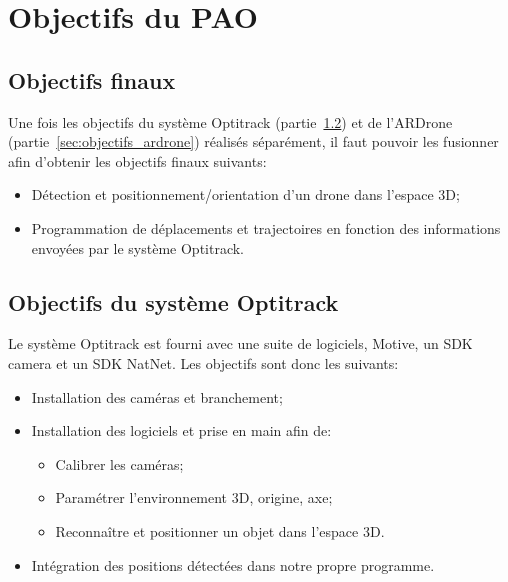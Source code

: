 \chapter{Objectifs du PAO}
\label{chap:objectifs_pao}

	\section{Objectifs finaux}
	\label{sec:objectifs_finaux}
		Une fois les objectifs du système Optitrack (partie~\ref{sec:objectifs_systeme_optitrack}) et de l'ARDrone (partie~\ref{sec:objectifs_ardrone}) réalisés séparément, il faut pouvoir les fusionner afin d'obtenir les objectifs finaux suivants: \\
		\begin{itemize}
			\item Détection et positionnement/orientation d'un drone dans l'espace 3D\@;
			\item Programmation de déplacements et trajectoires en fonction des informations envoyées par le système Optitrack.
		\end{itemize}


	\section{Objectifs du système Optitrack}
	\label{sec:objectifs_systeme_optitrack}
		Le système Optitrack est fourni avec une suite de logiciels, Motive, un SDK camera et un SDK NatNet. Les objectifs sont donc les suivants: \\
		\begin{itemize}
			\item Installation des caméras et branchement;
			\item Installation des logiciels et prise en main afin de:
			\begin{itemize}
				\item Calibrer les caméras;
				\item Paramétrer l'environnement 3D, origine, axe;
				\item Reconnaître et positionner un objet dans l'espace 3D\@.
			\end{itemize}
			\item Intégration des positions détectées dans notre propre programme.
		\end{itemize}


